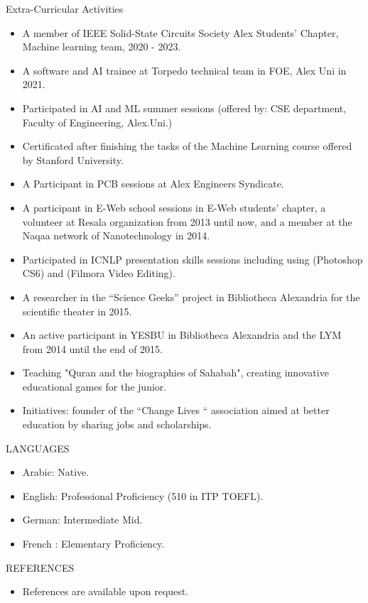 \documentclass{resume} %
\begin{document}
\begin{rSection}{Extra-Curricular Activities} 
\begin{itemize}
    
    \item A member of IEEE Solid-State Circuits Society Alex Students' Chapter, Machine learning team, 2020 - 2023.
     \item A software and AI trainee at Torpedo technical team in FOE, Alex Uni in 2021.
    \item 	Participated in AI and ML summer sessions (offered by: CSE department, Faculty of Engineering, Alex.Uni.)
    \item   Certificated after finishing the tasks of the Machine Learning course offered by Stanford University.
    \item A Participant in PCB sessions at Alex Engineers Syndicate.
    \item A participant in E-Web school sessions in E-Web students' chapter, a volunteer at Resala organization from 2013 until now, and a member at the Naqaa network of Nanotechnology in 2014.
    \item Participated in ICNLP presentation skills sessions including using (Photoshop CS6) and (Filmora Video Editing).

    \item A researcher in the “Science Geeks” project in Bibliotheca Alexandria for the scientific theater in 2015.
    \item An active participant in YESBU in Bibliotheca Alexandria and the LYM from 2014 until the end of 2015.
    \item Teaching "Quran and the biographies of Sahabah", creating innovative educational games for the junior.
    \item Initiatives: founder of the “Change Lives “ association aimed at better education by sharing jobs and scholarships.
\end{itemize}


\end{rSection}

\begin{rSection}{LANGUAGES} 
\begin{itemize}
    \item 	Arabic:      Native.
    \item   English:     Professional Proficiency (510 in ITP TOEFL).
    \item German:    Intermediate Mid.
    \item   French  :      Elementary Proficiency.

\end{itemize}
\end{rSection}




\begin{rSection}{REFERENCES} 
\begin{itemize}
    \item 	References are available upon request.
\end{itemize}


\end{rSection}
\end{document}
